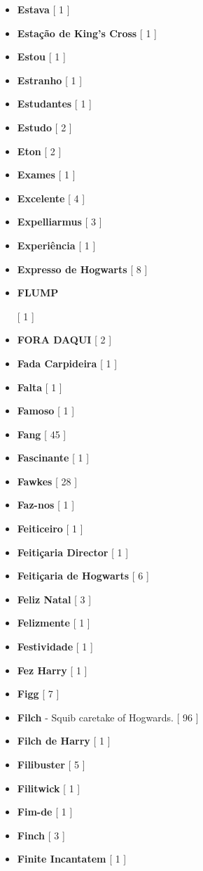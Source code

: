 \documentclass[a4paper]{article}
\begin{document}
\begin{itemize}
	\item \textbf{Estava} [ 1 ]
	\item \textbf{Estação de King's Cross} [ 1 ]
	\item \textbf{Estou} [ 1 ]
	\item \textbf{Estranho} [ 1 ]
	\item \textbf{Estudantes} [ 1 ]
	\item \textbf{Estudo} [ 2 ]
	\item \textbf{Eton} [ 2 ]
	\item \textbf{Exames} [ 1 ]
	\item \textbf{Excelente} [ 4 ]
	\item \textbf{Expelliarmus} [ 3 ]
	\item \textbf{Experiência} [ 1 ]
	\item \textbf{Expresso de Hogwarts} [ 8 ]
	\item \hypertarget{F}{\textbf{FLUMP}} [ 1 ]
	\item \textbf{FORA DAQUI} [ 2 ]
	\item \textbf{Fada Carpideira} [ 1 ]
	\item \textbf{Falta} [ 1 ]
	\item \textbf{Famoso} [ 1 ]
	\item \textbf{Fang} [ 45 ]
	\item \textbf{Fascinante} [ 1 ]
	\item \textbf{Fawkes} [ 28 ]
	\item \textbf{Faz-nos} [ 1 ]
	\item \textbf{Feiticeiro} [ 1 ]
	\item \textbf{Feitiçaria Director} [ 1 ]
	\item \textbf{Feitiçaria de Hogwarts} [ 6 ]
	\item \textbf{Feliz Natal} [ 3 ]
	\item \textbf{Felizmente} [ 1 ]
	\item \textbf{Festividade} [ 1 ]
	\item \textbf{Fez Harry} [ 1 ]
	\item \textbf{Figg} [ 7 ]
	\item \textbf{Filch} - Squib caretake of Hogwards. [ 96 ]
	\item \textbf{Filch de Harry} [ 1 ]
	\item \textbf{Filibuster} [ 5 ]
	\item \textbf{Filitwick} [ 1 ]
	\item \textbf{Fim-de} [ 1 ]
	\item \textbf{Finch} [ 3 ]
	\item \textbf{Finite Incantatem} [ 1 ]

\end{itemize}
\end{document}
